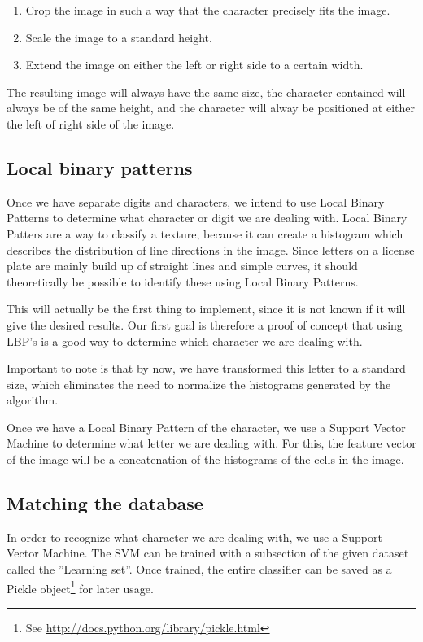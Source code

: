 \documentclass[a4paper]{article}
\begin{document}
\begin{enumerate}
    \item Crop the image in such a way that the character precisely fits the
          image.
    \item Scale the image to a standard height.
    \item Extend the image on either the left or right side to a certain width.
\end{enumerate}

The resulting image will always have the same size, the character contained
will always be of the same height, and the character will alway be positioned
at either the left of right side of the image.

\subsection{Local binary patterns}

Once we have separate digits and characters, we intend to use Local Binary
Patterns to determine what character or digit we are dealing with. Local Binary
Patters are a way to classify a texture, because it can create a histogram
which describes the distribution of line directions in the image. Since letters
on a license plate are mainly build up of straight lines and simple curves, it
should theoretically be possible to identify these using Local Binary Patterns.

This will actually be the first thing to implement, since it is not known if it
will give the desired results. Our first goal is therefore a proof of concept
that using LBP's is a good way to determine which character we are dealing
with.

Important to note is that by now, we have transformed this letter to a standard
size, which eliminates the need to normalize the histograms generated by the
algorithm.

Once we have a Local Binary Pattern of the character, we use a Support Vector
Machine to determine what letter we are dealing with. For this, the feature
vector of the image will be a concatenation of the histograms of the cells in
the image.

\subsection{Matching the database}

In order to recognize what character we are dealing with, we use a Support
Vector Machine. The SVM can be trained with a subsection of the given dataset
called the ''Learning set''. Once trained, the entire classifier can be saved
as a Pickle object\footnote{See
\url{http://docs.python.org/library/pickle.html}} for later usage.
\end{document}
